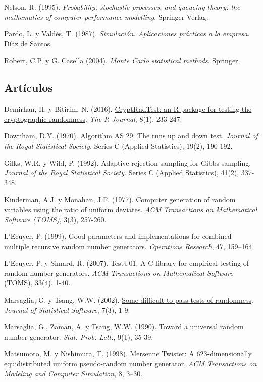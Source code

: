 \documentclass[
]{book}
\theoremstyle{break}
\theoremstyle{definition}
\theoremstyle{definition}
\theoremstyle{definition}
\theoremstyle{remark}
\begin{document}
Nelson, R. (1995). \emph{Probability, stochastic processes, and queueing theory: the mathematics of computer performance modelling}. Springer-Verlag.

Pardo, L. y Valdés, T. (1987). \emph{Simulación. Aplicaciones prácticas a la empresa}. Díaz de Santos.

Robert, C.P. y G. Casella (2004). \emph{Monte Carlo statistical methods}. Springer.

\hypertarget{artuxedculos}{%
\subsection*{Artículos}\label{artuxedculos}}

Demirhan, H. y Bitirim, N. (2016). \href{https://journal.r-project.org/archive/2016/RJ-2016-016/index.html}{CryptRndTest: an R package for testing the cryptographic randomness}. \emph{The R Journal}, 8(1), 233-247.

Downham, D.Y. (1970). Algorithm AS 29: The runs up and down test. \emph{Journal of the Royal Statistical Society}. Series C (Applied Statistics), 19(2), 190-192.

Gilks, W.R. y Wild, P. (1992). Adaptive rejection sampling for Gibbs sampling. \emph{Journal of the Royal Statistical Society}. Series C (Applied Statistics), 41(2), 337-348.

Kinderman, A.J. y Monahan, J.F. (1977). Computer generation of random variables using the ratio of uniform deviates. \emph{ACM Transactions on Mathematical Software (TOMS)}, 3(3), 257-260.

L'Ecuyer, P. (1999). Good parameters and implementations for combined multiple recursive random number generators. \emph{Operations Research}, 47, 159--164.

L'Ecuyer, P. y Simard, R. (2007). TestU01: A C library for empirical testing of random number generators. \emph{ACM Transactions on Mathematical Software} (TOMS), 33(4), 1-40.

Marsaglia, G. y Tsang, W.W. (2002). \href{http://www.jstatsoft.org/v07/i03}{Some difficult-to-pass tests of randomness}. \emph{Journal of Statistical Software}, 7(3), 1-9.

Marsaglia, G., Zaman, A. y Tsang, W.W. (1990). Toward a universal random number generator. \emph{Stat. Prob. Lett.}, 9(1), 35-39.

Matsumoto, M. y Nishimura, T. (1998). Mersenne Twister: A 623-dimensionally equidistributed uniform pseudo-random number generator, \emph{ACM Transactions on Modeling and Computer Simulation}, 8, 3--30.
\end{document}
